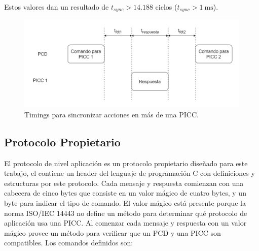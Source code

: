 \documentclass[a4paper, twoside, 11pt]{report}
\begin{document}
Estos valores dan un resultado de $t_{sync} > 14.188$ ciclos ($t_{sync} > \SI{1}{\milli\second}$).

\begin{figure}[htb]
  \centering
  \includegraphics[width=1.0\textwidth]{./img/app_synch3.drawio}
  \caption{Timings para sincronizar acciones en más de una PICC.}
  \label{fig:app_synch}
\end{figure}

\FloatBarrier
\subsection{Protocolo Propietario}

El protocolo de nivel aplicación es un protocolo propietario diseñado para este trabajo, el  contiene un header del lenguaje de programación C con definiciones y estructuras por este protocolo. Cada mensaje y respuesta comienzan con una cabecera de cinco bytes que consiste en un valor mágico de cuatro bytes, y un byte para indicar el tipo de comando. El valor mágico está presente porque la norma ISO/IEC 14443 no define un método para determinar qué protocolo de aplicación usa una PICC. Al comenzar cada mensaje y respuesta con un valor mágico provee un método para verificar que un PCD y una PICC son compatibles. Los comandos definidos son:
\end{document}
